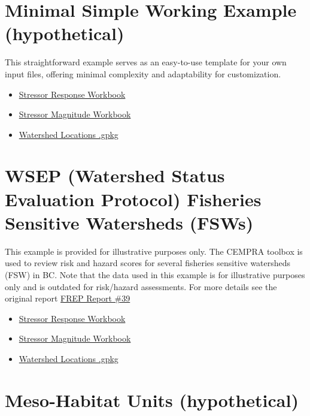 \documentclass[
  letterpaper,
  DIV=11,
  numbers=noendperiod]{scrreprt}
\providecommand{\tightlist}{%
  \setlength{\itemsep}{0pt}\setlength{\parskip}{0pt}}
\begin{document}
\section{Minimal Simple Working Example
(hypothetical)}\label{minimal-simple-working-example-hypothetical}

This straightforward example serves as an easy-to-use template for your
own input files, offering minimal complexity and adaptability for
customization.

\begin{itemize}
\tightlist
\item
  \href{./sample_data/meso_habitat/stressor_response_simple.xlsx}{Stressor
  Response Workbook}
\item
  \href{./sample_data/meso_habitat/stressor_magnitude_simple.xlsx}{Stressor
  Magnitude Workbook}
\item
  \href{./sample_data/meso_habitat/locations_simple.gpkg}{Watershed
  Locations .gpkg}
\end{itemize}

\section{WSEP (Watershed Status Evaluation Protocol) Fisheries Sensitive
Watersheds
(FSWs)}\label{wsep-watershed-status-evaluation-protocol-fisheries-sensitive-watersheds-fsws}

This example is provided for illustrative purposes only. The CEMPRA
toolbox is used to review risk and hazard scores for several fisheries
sensitive watersheds (FSW) in BC. Note that the data used in this
example is for illustrative purposes only and is outdated for
risk/hazard assessments. For more details see the original report
\href{https://www.for.gov.bc.ca/ftp/hfp/external/!publish/FREP/reports/FREP_Report_39.pdf}{FREP
Report \#39}

\begin{itemize}
\tightlist
\item
  \href{./sample_data/frep39/FREP_Stressor_Response.xlsx}{Stressor
  Response Workbook}
\item
  \href{./sample_data/frep39/FREP_Stressor_Magnitude.xlsx}{Stressor
  Magnitude Workbook}
\item
  \href{./sample_data/frep39/FREP_watersheds.gpkg}{Watershed Locations
  .gpkg}
\end{itemize}

\section{Meso-Habitat Units
(hypothetical)}\label{meso-habitat-units-hypothetical}
\end{document}
